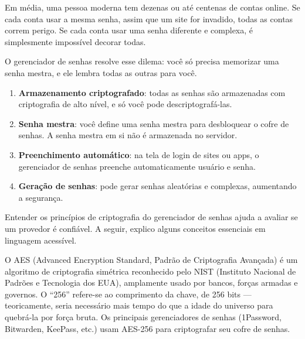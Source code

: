 


Em média, uma pessoa moderna tem dezenas ou até centenas de contas online. Se cada conta usar a mesma senha, assim que um site for invadido, todas as contas correm perigo. Se cada conta usar uma senha diferente e complexa, é simplesmente impossível decorar todas.

O gerenciador de senhas resolve esse dilema: você só precisa memorizar uma senha mestra, e ele lembra todas as outras para você.


\begin{enumerate}
  \item \textbf{Armazenamento criptografado}: todas as senhas são armazenadas com criptografia de alto nível, e só você pode descriptografá-las.
  \item \textbf{Senha mestra}: você define uma senha mestra para desbloquear o cofre de senhas. A senha mestra em si não é armazenada no servidor.
  \item \textbf{Preenchimento automático}: na tela de login de sites ou apps, o gerenciador de senhas preenche automaticamente usuário e senha.
  \item \textbf{Geração de senhas}: pode gerar senhas aleatórias e complexas, aumentando a segurança.
\end{enumerate}


Entender os princípios de criptografia do gerenciador de senhas ajuda a avaliar se um provedor é confiável. A seguir, explico alguns conceitos essenciais em linguagem acessível.


O AES (Advanced Encryption Standard, Padrão de Criptografia Avançada) é um algoritmo de criptografia simétrica reconhecido pelo NIST (Instituto Nacional de Padrões e Tecnologia dos EUA), amplamente usado por bancos, forças armadas e governos. O “256” refere-se ao comprimento da chave, de 256 bits — teoricamente, seria necessário mais tempo do que a idade do universo para quebrá-la por força bruta. Os principais gerenciadores de senhas (1Password, Bitwarden, KeePass, etc.) usam AES-256 para criptografar seu cofre de senhas.

